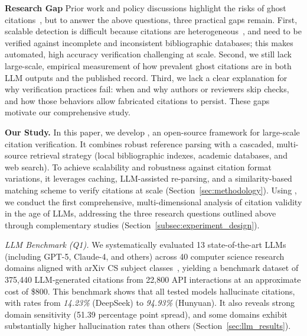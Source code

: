 \noindent
\textbf{Research Gap}
Prior work and policy discussions highlight the risks of ghost citations~\cite{chairs2025iclr,thorp2023chatgpt,oladokun2025hallucitation}, but to answer the above questions, three practical gaps remain. First, scalable detection is difficult because citations are heterogeneous~\cite{ISO690_2021}, and need to be verified against incomplete and inconsistent bibliographic databases; this makes automated, high accuracy verification challenging at scale. 
Second, we still lack large-scale, empirical measurement of how prevalent ghost citations are in both LLM outputs and the published record. 
Third, we lack a clear explanation for why verification practices fail: when and why authors or reviewers skip checks, and how those behaviors allow fabricated citations to persist. 
These gaps motivate our comprehensive study.

\noindent
\textbf{Our Study.}
In this paper, we develop \citeb, an open-source framework for large-scale citation verification.
It combines robust reference parsing with a cascaded, multi-source retrieval strategy (local bibliographic indexes, academic databases, and web search).
To achieve scalability and robustness against citation format variations, it leverages caching, LLM-assisted re-parsing, and a similarity-based matching scheme\cite{levenshtein1966binary} to verify citations at scale (Section~\ref{sec:methodology}).
Using \citeb, we conduct the first comprehensive, multi-dimensional analysis of citation validity in the age of LLMs, addressing the three research questions outlined above through complementary studies (Section~\ref{subsec:experiment_design}).

\textit{LLM Benchmark (Q1).}
We systematically evaluated 13 state-of-the-art LLMs (including GPT-5, Claude-4, and others) across 40 computer science research domains aligned with arXiv CS subject classes~\cite{arxivCSClasses}, yielding a benchmark dataset of 375,440 LLM-generated citations from 22,800 API interactions at an approximate cost of \$800.
This benchmark shows that all tested models hallucinate citations, with rates from \textit{14.23\%} (DeepSeek) to \textit{94.93\%} (Hunyuan). It also reveals strong domain sensitivity (51.39 percentage point spread), and some domains exhibit substantially higher hallucination rates than others (Section~\ref{sec:llm_results}).

